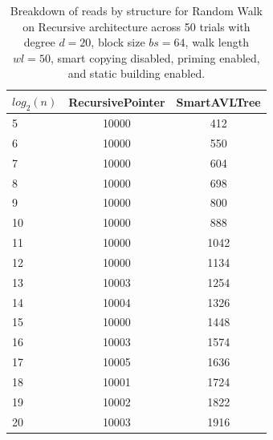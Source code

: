 \begin{table}[]
\centering
\begin{tabular}{|l|c|c|}
$log_2(n)$ & RecursivePointer & SmartAVLTree \\ \hline
5 & 10000 & 412 \\ \hline
6 & 10000 & 550 \\ \hline
7 & 10000 & 604 \\ \hline
8 & 10000 & 698 \\ \hline
9 & 10000 & 800 \\ \hline
10 & 10000 & 888 \\ \hline
11 & 10000 & 1042 \\ \hline
12 & 10000 & 1134 \\ \hline
13 & 10003 & 1254 \\ \hline
14 & 10004 & 1326 \\ \hline
15 & 10000 & 1448 \\ \hline
16 & 10003 & 1574 \\ \hline
17 & 10005 & 1636 \\ \hline
18 & 10001 & 1724 \\ \hline
19 & 10002 & 1822 \\ \hline
20 & 10003 & 1916 \\ \hline
\end{tabular}
\caption{Breakdown of reads by structure for Random Walk on Recursive architecture across 50 trials with degree $d=20$, block size $bs=64$, walk length $wl=50$, smart copying disabled, priming enabled, and static building enabled.}
    \label{tab:reads_by_structure_rw_d20_bs64_trials50_copiesfalse_primetrue_staticinsertiontrue_wl50_ptrecursive_movetrue}
\end{table}

